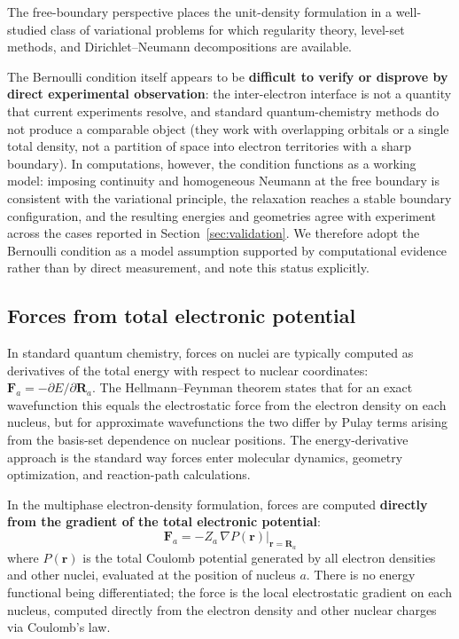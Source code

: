 \documentclass[11pt]{article}
\begin{document}
The free-boundary perspective places the unit-density formulation in a well-studied class of variational problems for which regularity theory, level-set methods, and Dirichlet--Neumann decompositions are available.

The Bernoulli condition itself appears to be \textbf{difficult to verify or disprove by direct experimental observation}: the inter-electron interface is not a quantity that current experiments resolve, and standard quantum-chemistry methods do not produce a comparable object (they work with overlapping orbitals or a single total density, not a partition of space into electron territories with a sharp boundary). In computations, however, the condition functions as a working model: imposing continuity and homogeneous Neumann at the free boundary is consistent with the variational principle, the relaxation reaches a stable boundary configuration, and the resulting energies and geometries agree with experiment across the cases reported in Section~\ref{sec:validation}. We therefore adopt the Bernoulli condition as a model assumption supported by computational evidence rather than by direct measurement, and note this status explicitly.

\subsection{Forces from total electronic potential}\label{sec:forces}

In standard quantum chemistry, forces on nuclei are typically computed as derivatives of the total energy with respect to nuclear coordinates: $\mathbf{F}_a = -\partial E / \partial \mathbf{R}_a$. The Hellmann--Feynman theorem states that for an exact wavefunction this equals the electrostatic force from the electron density on each nucleus, but for approximate wavefunctions the two differ by Pulay terms arising from the basis-set dependence on nuclear positions. The energy-derivative approach is the standard way forces enter molecular dynamics, geometry optimization, and reaction-path calculations.

In the multiphase electron-density formulation, forces are computed \textbf{directly from the gradient of the total electronic potential}:
\begin{equation}
\mathbf{F}_a = -Z_a \, \nabla P(\mathbf{r}) \big|_{\mathbf{r} = \mathbf{R}_a}
\end{equation}
where $P(\mathbf{r})$ is the total Coulomb potential generated by all electron densities and other nuclei, evaluated at the position of nucleus $a$. There is no energy functional being differentiated; the force is the local electrostatic gradient on each nucleus, computed directly from the electron density and other nuclear charges via Coulomb's law.
\end{document}
